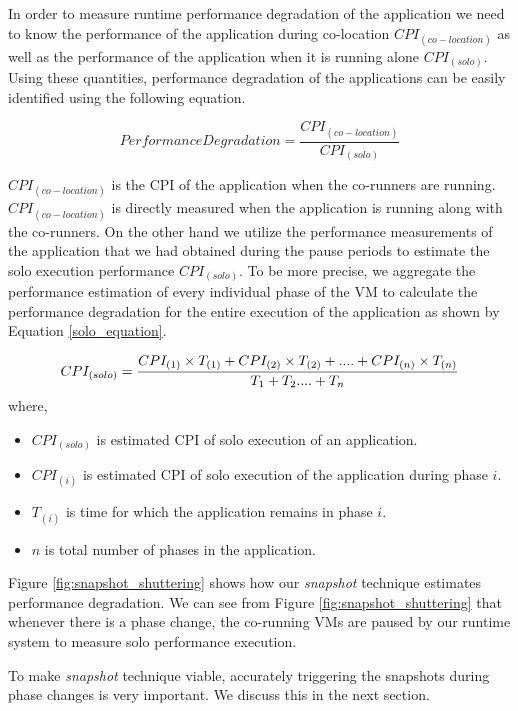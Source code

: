 \documentclass{sig-alternate}
\begin{document}
In order to measure runtime performance degradation of the application we need to know the performance of the application during co-location $CPI_{(co-location)}$ as well as the performance of the application when it is running alone $CPI_{(solo)}$. Using these quantities, performance degradation of the applications can be easily identified using the following equation.

\begin{equation} \label{eq:degradation_equation}
Performance Degradation = \dfrac{CPI_{(co-location)}}{CPI_{(solo)}}
\end{equation}

$CPI_{(co-location)}$ is the CPI of the application when the co-runners are running. $CPI_{(co-location)}$ is directly measured when the application is running along with the co-runners. On the other hand we utilize the performance measurements of the application that we had obtained during the pause periods to estimate the solo execution performance $CPI_{(solo)}$. To be more precise, we aggregate the performance estimation of every individual phase of the VM to calculate the performance degradation for the entire execution of the application as shown by Equation \ref{solo_equation}.

\begin{equation} \label{solo_equation}
\small CPI_{(solo)} = \dfrac{CPI_{(1)} \times T_{(1)} + CPI_{(2)} \times T_{(2)} + . . . . + CPI_{(n)} \times T_{(n)}}{T_{1} + T_{2} . . . . + T_{n}}
\end{equation}
where,
\begin{itemize}
\item $CPI_{(solo)}$ is estimated CPI of solo execution of an application.
\item $CPI_{(i)}$ is estimated CPI of solo execution of the application during phase $i$.
\item $T_{(i)}$ is time for which the application remains in phase $i$.
\item $n$ is total number of phases in the application.
\end{itemize}

Figure \ref{fig:snapshot_shuttering} shows how our \textit{snapshot} technique estimates performance degradation. We can see from  Figure \ref{fig:snapshot_shuttering} that whenever there is a phase change, the co-running VMs are paused by our runtime system to measure solo performance execution.

To make \textit{snapshot} technique viable, accurately triggering the snapshots during phase changes is very important. We discuss this in the next section.
\end{document}

